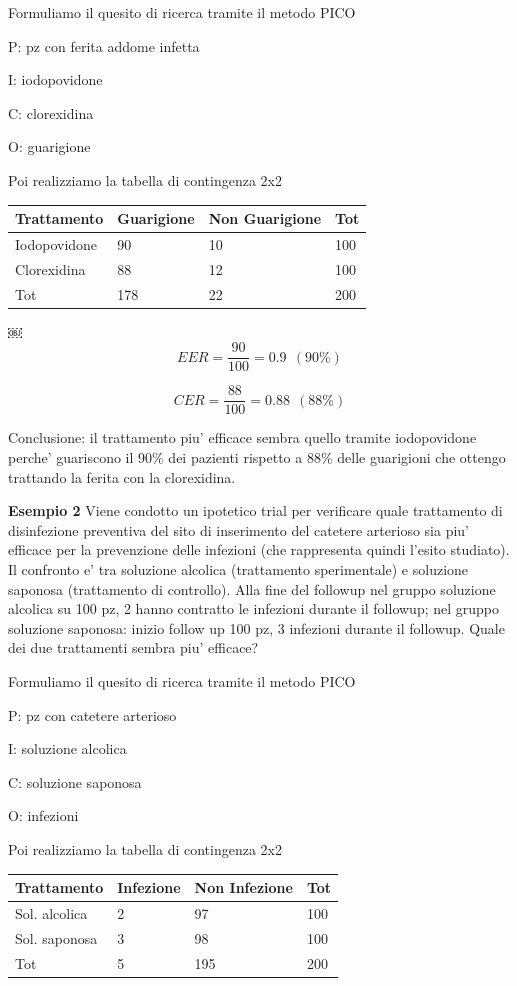 \documentclass[]{book}
\begin{document}
Formuliamo il quesito di ricerca tramite il metodo PICO

P: pz con ferita addome infetta

I: iodopovidone

C: clorexidina

O: guarigione

Poi realizziamo la tabella di contingenza 2x2

\begin{longtable}[]{@{}llll@{}}
\toprule
Trattamento & Guarigione & Non Guarigione & Tot\tabularnewline
\midrule
\endhead
Iodopovidone & 90 & 10 & 100\tabularnewline
Clorexidina & 88 & 12 & 100\tabularnewline
Tot & 178 & 22 & 200\tabularnewline
\bottomrule
\end{longtable}

￼
\[EER = \frac{90}{100} = 0.9 \ \ (90\%)\]

\[CER = \frac{88}{100} = 0.88 \ \ (88\%)\]

Conclusione: il trattamento piu' efficace sembra quello tramite iodopovidone perche' guariscono il 90\% dei pazienti rispetto a 88\% delle guarigioni che ottengo trattando la ferita con la clorexidina.

\textbf{Esempio 2}
Viene condotto un ipotetico trial per verificare quale trattamento di disinfezione preventiva del sito di inserimento del catetere arterioso sia piu' efficace per la prevenzione delle infezioni (che rappresenta quindi l'esito studiato). Il confronto e' tra soluzione alcolica (trattamento sperimentale) e soluzione saponosa (trattamento di controllo). Alla fine del followup nel gruppo soluzione alcolica su 100 pz, 2 hanno contratto le infezioni durante il followup; nel gruppo soluzione saponosa: inizio follow up 100 pz, 3 infezioni durante il followup. Quale dei due trattamenti sembra piu' efficace?

Formuliamo il quesito di ricerca tramite il metodo PICO

P: pz con catetere arterioso

I: soluzione alcolica

C: soluzione saponosa

O: infezioni

Poi realizziamo la tabella di contingenza 2x2

\begin{longtable}[]{@{}llll@{}}
\toprule
Trattamento & Infezione & Non Infezione & Tot\tabularnewline
\midrule
\endhead
Sol. alcolica & 2 & 97 & 100\tabularnewline
Sol. saponosa & 3 & 98 & 100\tabularnewline
Tot & 5 & 195 & 200\tabularnewline
\bottomrule
\end{longtable}
\end{document}

